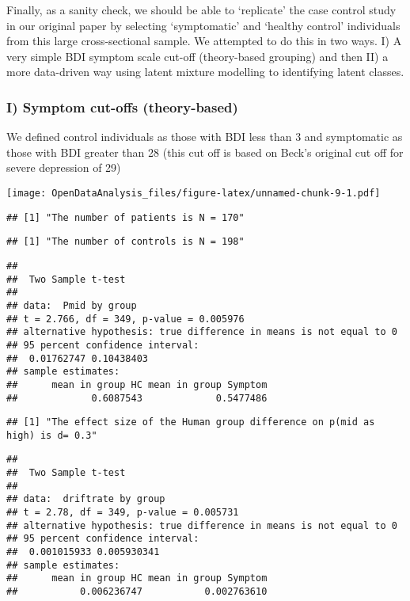 \documentclass[]{article}
\begin{document}
Finally, as a sanity check, we should be able to `replicate' the case
control study in our original paper by selecting `symptomatic' and
`healthy control' individuals from this large cross-sectional sample. We
attempted to do this in two ways. I) A very simple BDI symptom scale
cut-off (theory-based grouping) and then II) a more data-driven way
using latent mixture modelling to identifying latent classes.

\subsubsection{I) Symptom cut-offs
(theory-based)}\label{i-symptom-cut-offs-theory-based}

We defined control individuals as those with BDI less than 3 and
symptomatic as those with BDI greater than 28 (this cut off is based on
Beck's original cut off for severe depression of 29)

\texttt{[image: OpenDataAnalysis\_files/figure-latex/unnamed-chunk-9-1.pdf]}

\begin{verbatim}
## [1] "The number of patients is N = 170"
\end{verbatim}

\begin{verbatim}
## [1] "The number of controls is N = 198"
\end{verbatim}

\begin{verbatim}
## 
##  Two Sample t-test
## 
## data:  Pmid by group
## t = 2.766, df = 349, p-value = 0.005976
## alternative hypothesis: true difference in means is not equal to 0
## 95 percent confidence interval:
##  0.01762747 0.10438403
## sample estimates:
##      mean in group HC mean in group Symptom 
##             0.6087543             0.5477486
\end{verbatim}

\begin{verbatim}
## [1] "The effect size of the Human group difference on p(mid as high) is d= 0.3"
\end{verbatim}

\begin{verbatim}
## 
##  Two Sample t-test
## 
## data:  driftrate by group
## t = 2.78, df = 349, p-value = 0.005731
## alternative hypothesis: true difference in means is not equal to 0
## 95 percent confidence interval:
##  0.001015933 0.005930341
## sample estimates:
##      mean in group HC mean in group Symptom 
##           0.006236747           0.002763610
\end{verbatim}
\end{document}
